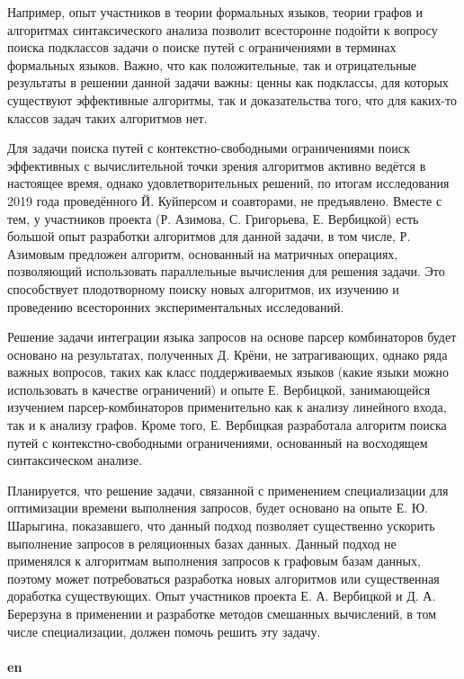 \documentclass[12pt]{article}  %
\theoremstyle{remark}
\begin{document}
Например, опыт участников в теории формальных языков, теории графов и алгоритмах синтаксического анализа позволит всесторонне подойти к вопросу поиска подклассов задачи о поиске путей с ограничениями в терминах формальных языков. Важно, что как положительные, так и отрицательные результаты в решении данной задачи важны: ценны как подклассы, для которых существуют эффективные алгоритмы, так и доказательства того, что для каких-то классов задач таких алгоритмов нет.

Для задачи поиска путей с контекстно-свободными ограничениями поиск эффективных с вычислительной точки зрения алгоритмов активно ведётся в настоящее время, однако удовлетворительных решений, по итогам исследования 2019 года проведённого Й. Куйперсом и соавторами, не предъявлено.
Вместе с тем, у участников проекта (Р. Азимова, С. Григорьева, Е. Вербицкой) есть большой опыт разработки алгоритмов для данной задачи, в том числе, Р. Азимовым предложен алгоритм, основанный на матричных операциях, позволяющий использовать параллельные вычисления для решения задачи. Это способствует плодотворному поиску новых алгоритмов, их изучению и проведению всесторонних экспериментальных исследований.

Решение задачи интеграции языка запросов на основе парсер комбинаторов будет основано на результатах, полученных Д. Крёни, не затрагивающих, однако ряда важных вопросов, таких как класс поддерживаемых языков (какие языки можно использовать в качестве ограничений) и опыте Е. Вербицкой, занимающейся изучением парсер-комбинаторов применительно как к анализу линейного входа, так и к анализу графов.
Кроме того, Е. Вербицкая разработала алгоритм поиска путей с контекстно-свободными ограничениями, основанный на восходящем синтаксическом анализе.

Планируется, что решение задачи, связанной с применением специализации для оптимизации времени выполнения запросов, будет основано на опыте Е. Ю. Шарыгина, показавшего, что данный подход позволяет существенно ускорить выполнение запросов в реляционных базах данных. Данный подход не применялся к алгоритмам выполнения запросов к графовым базам данных, поэтому может потребоваться разработка новых алгоритмов или существенная доработка существующих. Опыт участников проекта Е. А. Вербицкой и Д. А. Берерзуна в применении и разработке методов смешанных вычислений, в том числе специализации, должен помочь решить эту задачу.
\\
\\
\textbf{en}\\
\end{document}
